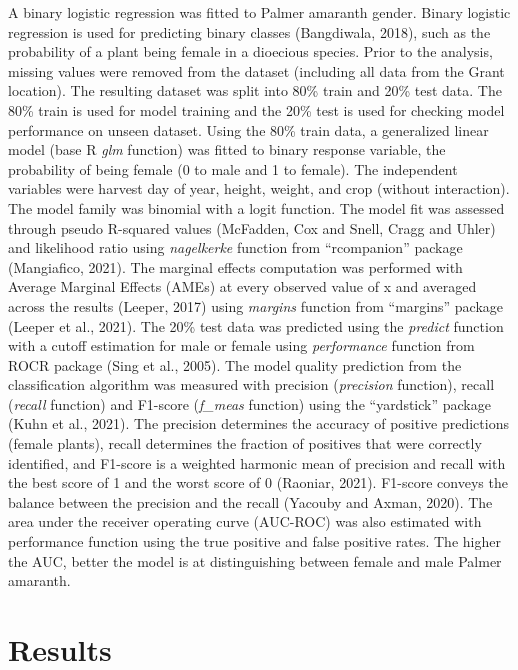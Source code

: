 \documentclass[utf8]{frontiersSCNS}
\begin{document}
A binary logistic regression was fitted to Palmer amaranth gender.
Binary logistic regression is used for predicting binary classes
(Bangdiwala, 2018), such as the probability of a plant being female in a
dioecious species. Prior to the analysis, missing values were removed
from the dataset (including all data from the Grant location). The
resulting dataset was split into 80\% train and 20\% test data. The 80\%
train is used for model training and the 20\% test is used for checking
model performance on unseen dataset. Using the 80\% train data, a
generalized linear model (base R \emph{glm} function) was fitted to
binary response variable, the probability of being female (0 to male and
1 to female). The independent variables were harvest day of year,
height, weight, and crop (without interaction). The model family was
binomial with a logit function. The model fit was assessed through
pseudo R-squared values (McFadden, Cox and Snell, Cragg and Uhler) and
likelihood ratio using \emph{nagelkerke} function from ``rcompanion''
package (Mangiafico, 2021). The marginal effects computation was
performed with Average Marginal Effects (AMEs) at every observed value
of x and averaged across the results (Leeper, 2017) using \emph{margins}
function from ``margins'' package (Leeper et al., 2021). The 20\% test
data was predicted using the \emph{predict} function with a cutoff
estimation for male or female using \emph{performance} function from
ROCR package (Sing et al., 2005). The model quality prediction from the
classification algorithm was measured with precision (\emph{precision}
function), recall (\emph{recall} function) and F1-score (\emph{f\_meas}
function) using the ``yardstick'' package (Kuhn et al., 2021). The
precision determines the accuracy of positive predictions (female
plants), recall determines the fraction of positives that were correctly
identified, and F1-score is a weighted harmonic mean of precision and
recall with the best score of 1 and the worst score of 0 (Raoniar,
2021). F1-score conveys the balance between the precision and the recall
(Yacouby and Axman, 2020). The area under the receiver operating curve
(AUC-ROC) was also estimated with performance function using the true
positive and false positive rates. The higher the AUC, better the model
is at distinguishing between female and male Palmer amaranth.

\hypertarget{results}{%
\section*{Results}\label{results}}
\end{document}
